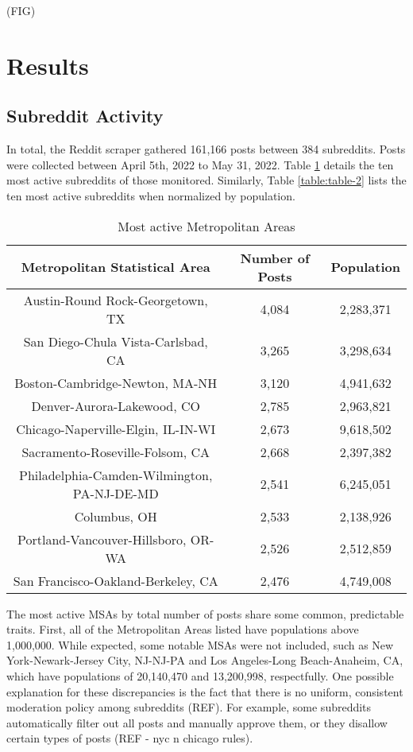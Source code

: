 \documentclass[12pt,oneside, letterpaper]{book}
\begin{document}
(FIG)

\section{Results}

\subsection{Subreddit Activity}

\par In total, the Reddit scraper gathered 161,166 posts between 384 subreddits. Posts were collected between April 5th, 2022 to May 31, 2022. Table \ref{table:table-1} details the ten most active subreddits of those monitored. Similarly, Table \ref{table:table-2} lists the ten most active subreddits when normalized by population.

\begin{table}[h!]
    \centering
    \small
    \caption{Most active Metropolitan Areas}
    \begin{tabular}{| c | c | c |}
    \hline
    Metropolitan Statistical Area & Number of Posts & Population\\ \hline
    Austin-Round Rock-Georgetown, TX & 4,084 & 2,283,371 \\ \hline
    San Diego-Chula Vista-Carlsbad, CA & 3,265 & 3,298,634 \\ \hline
    Boston-Cambridge-Newton, MA-NH & 3,120 & 4,941,632 \\ \hline
    Denver-Aurora-Lakewood, CO & 2,785 & 2,963,821 \\ \hline
    Chicago-Naperville-Elgin, IL-IN-WI & 2,673 & 9,618,502 \\ \hline
    Sacramento-Roseville-Folsom, CA & 2,668 & 2,397,382 \\ \hline
    Philadelphia-Camden-Wilmington, PA-NJ-DE-MD & 2,541 & 6,245,051 \\ \hline
    Columbus, OH & 2,533 & 2,138,926 \\ \hline
    Portland-Vancouver-Hillsboro, OR-WA & 2,526 & 2,512,859 \\ \hline
    San Francisco-Oakland-Berkeley, CA & 2,476 & 4,749,008 \\ \hline
	\end{tabular}
	\label{table:table-1}
\end{table}

\par The most active MSAs by total number of posts share some common, predictable traits. First, all of the Metropolitan Areas listed have populations above 1,000,000. While expected, some notable MSAs were not included, such as New York-Newark-Jersey City, NJ-NJ-PA and Los Angeles-Long Beach-Anaheim, CA, which have populations of 20,140,470 and 13,200,998, respectfully. One possible explanation for these discrepancies is the fact that there is no uniform, consistent moderation policy among subreddits (REF). For example, some subreddits automatically filter out all posts and manually approve them, or they disallow certain types of posts (REF - nyc n chicago rules).
\end{document}
